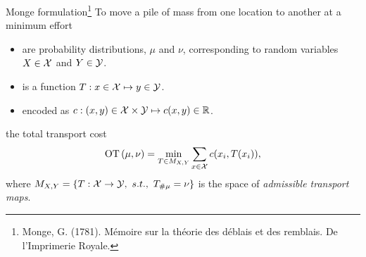 \documentclass[pdf,aspectratio=169,10pt]{beamer}
\begin{document}
\begin{frame}[plain]{Monge formulation\footnote{Monge, G. (1781).
Mémoire sur la théorie des déblais et des remblais.
De l'Imprimerie Royale.}}
 To move a pile of mass from one location to another at a minimum effort\\
\vspace{1em}

\begin{minipage}[t]{0.69\textwidth}
   \begin{itemize}
       \item {} are probability distributions, $\mu$ and $\nu$, corresponding to random variables $X\in{\mathcal{X}}$ and $Y\in{\mathcal{Y}}$. 
       \item {} is a function $T: x \in {\mathcal{X}}\mapsto y\in{\mathcal{Y}}$.
    \item {} encoded as $c: (x,y)\in{\mathcal{X}}\times{\mathcal{Y}}\mapsto c(x,y)\in{\mathbb{R}}$.
   \end{itemize}
\vspace{1em}

  the total transport cost
    \begin{equation}
        \operatorname{OT}{(\mu,\nu)} = \min_{T\in M_{X,Y}}\sum_{x\in{\mathcal{X}}} c(x_i, T(x_i)),
    \end{equation}
     where $M_{X,Y} = \{ T: {\mathcal{X}} \to {\mathcal{Y}},\ s.t.,\ T_{\#\mu}=\nu \}$ is the space of \emph{admissible transport maps}.
\end{minipage}   
\hfill
\begin{minipage}[t]{0.3\textwidth}
\vspace{2em}
\end{minipage}   

\end{frame}
\end{document}
